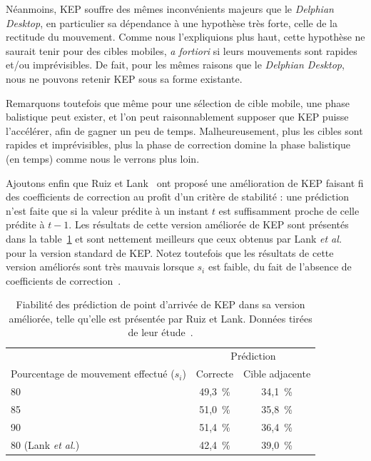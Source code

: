 	Néanmoins, KEP souffre des mêmes inconvénients majeurs que le \emph{Delphian Desktop}, en particulier sa dépendance à une hypothèse très forte, celle de la rectitude du mouvement. Comme nous l'expliquions plus haut, cette hypothèse ne saurait tenir pour des cibles mobiles, \emph{a fortiori} si leurs mouvements sont rapides et/ou imprévisibles. De fait, pour les mêmes raisons que le \emph{Delphian Desktop}, nous ne pouvons retenir KEP sous sa forme existante.
	
	Remarquons toutefois que même pour une sélection de cible mobile, une phase balistique peut exister, et l'on peut raisonnablement supposer que KEP puisse l'accélérer, afin de gagner un peu de temps. Malheureusement, plus les cibles sont rapides et imprévisibles, plus la phase de correction domine la phase balistique (en temps) comme nous le verrons plus loin.
	
	Ajoutons enfin que Ruiz et Lank~\cite{ruiz2009effects} ont proposé une amélioration de KEP faisant fi des coefficients de correction au profit d'un critère de stabilité : une prédiction n'est faite que si la valeur prédite à un instant $t$ est suffisamment proche de celle prédite à $t-1$. Les résultats de cette version améliorée de KEP sont présentés dans la table~\ref{tab:kepStable} et sont nettement meilleurs que ceux obtenus par Lank \emph{et al.} pour la version standard de KEP. Notez toutefois que les résultats de cette version améliorés sont très mauvais lorsque $s_{i}$ est faible, du fait de l'absence de coefficients de correction~\cite{ruiz2009effects}.
	
	\begin{table}
	\centering
	\begin{tabular}{l | c c}
														& \multicolumn{2}{c}{Prédiction}	\\
		Pourcentage de mouvement effectué ($s_{i}$)	& Correcte	& Cible adjacente	\bigstrut[b] \\ \hline
		80												& 49,3~\%{}	& 34,1~\%{}			\bigstrut[t] \\
		85												& 51,0~\%{}	& 35,8~\%{}			\\
		90												& 51,4~\%{}	& 36,4~\%{}			\\
		80 (Lank \emph{et al.})							& 42,4~\%{}	& 39,0~\%{}			\\
	\end{tabular}
	\caption[KEP stable --- Fiabilité des prédictions]{Fiabilité des prédiction de point d'arrivée de KEP dans sa version améliorée, telle qu'elle est présentée par Ruiz et Lank. Données tirées de leur étude~\cite{ruiz2009effects}.}
	\label{tab:kepStable}
	\end{table}
		
